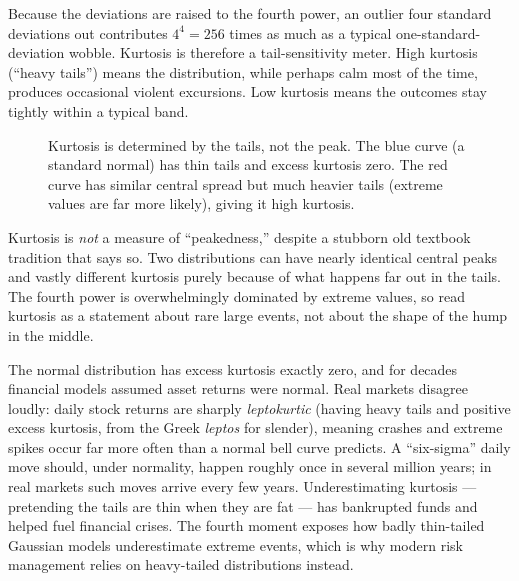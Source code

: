 Because the deviations are raised to the fourth power, an outlier four
standard deviations out contributes $4^4 = 256$ times as much as a typical
one-standard-deviation wobble. Kurtosis is therefore a tail-sensitivity meter.
High kurtosis (``heavy tails'') means the distribution, while perhaps calm
most of the time, produces occasional violent excursions. Low kurtosis means
the outcomes stay tightly within a typical band.

\begin{figure}[H]
\centering
{}
\caption{Kurtosis is determined by the tails, not the peak. The blue curve (a standard normal)
has thin tails and excess kurtosis zero. The red curve has similar central spread but much
heavier tails (extreme values are far more likely), giving it high kurtosis.}
\label{ch09:fig-kurtosis}
\end{figure}

\begin{trapbox}
Kurtosis is \emph{not} a measure of ``peakedness,'' despite a stubborn old
textbook tradition that says so. Two distributions can have nearly identical
central peaks and vastly different kurtosis purely because of what happens far
out in the tails. The fourth power is overwhelmingly dominated by extreme
values, so read kurtosis as a statement about rare large events, not about
the shape of the hump in the middle.
\end{trapbox}

\begin{applicationbox}
The normal distribution has excess kurtosis exactly zero, and for decades
financial models assumed asset returns were normal. Real markets disagree
loudly: daily stock returns are sharply \emph{leptokurtic} (having heavy tails
and positive excess kurtosis, from the Greek \emph{leptos} for slender),
meaning crashes and extreme spikes occur far more often than a normal bell
curve predicts. A ``six-sigma'' daily move should, under normality, happen roughly
once in several million years; in real markets such moves arrive every few
years. Underestimating kurtosis --- pretending the tails are thin when they
are fat --- has bankrupted funds and helped fuel financial crises. The fourth
moment exposes how badly thin-tailed Gaussian models underestimate extreme
events, which is why modern risk management relies on heavy-tailed distributions
instead.
\end{applicationbox}

